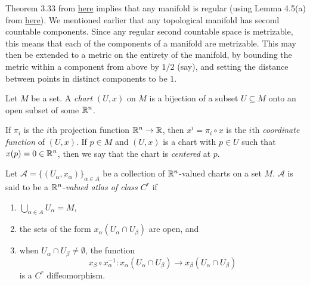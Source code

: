 Theorem 3.33 from \href{https://amitrajaraman.github.io/notes/ma-406/connandcomp.pdf}{here} implies that any manifold is regular (using Lemma 4.5(a) from \href{https://amitrajaraman.github.io/notes/ma-406/axioms.pdf}{here}). We mentioned earlier that any topological manifold has second countable components. Since any regular second countable space is metrizable, this means that each of the components of a manifold are metrizable. This may then be extended to a metric on the entirety of the manifold, by bounding the metric within a component from above by $1/2$ (say), and setting the distance between points in distinct components to be $1$.

\begin{fdef}[Chart]
	Let $M$ be a set. A \emph{chart} $(U,x)$ on $M$ is a bijection of a subset $U \subseteq M$ onto an open subset of some $\mathbb{R}^n$.
\end{fdef}

If $\pi_i$ is the $i$th projection function $\mathbb{R}^n \to \mathbb{R}$, then $x^i = \pi_i \circ x$ is the $i$th \emph{coordinate function} of $(U,x)$. If $p \in M$ and $(U,x)$ is a chart with $p \in U$ such that $x(p) = 0 \in \mathbb{R}^n$, then we say that the chart is \emph{centered} at $p$.

\begin{fdef}[Atlas]
	Let $\mathcal{A} = \{(U_\alpha,x_\alpha)\}_{\alpha \in A}$ be a collection of $\mathbb{R}^n$-valued charts on a set $M$. $\mathcal{A}$ is said to be a \emph{$\mathbb{R}^n$-valued atlas of class $C^r$} if
	\begin{enumerate}
		\item $\bigcup_{\alpha \in A} U_\alpha = M$,
		\item the sets of the form $x_\alpha(U_\alpha \cap U_\beta)$ are open, and
		\item when $U_\alpha \cap U_\beta \ne \emptyset$, the function
		\[ x_\beta \circ x_\alpha^{-1} : x_\alpha(U_\alpha \cap U_\beta) \to x_\beta(U_\alpha \cap U_\beta) \]
		is a $C^r$ diffeomorphism.\footnotemark
	\end{enumerate}
\end{fdef}

